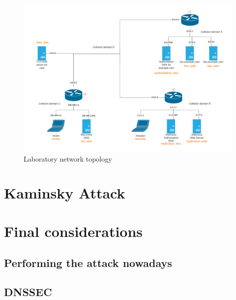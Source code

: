\documentclass[11pt,a4paper]{article}
\begin{document}
\begin{figure}[h!]
  \centering
  \includegraphics[width=16cm]{network-topology.png}
  \caption{Laboratory network topology}
\end{figure}

\newpage
\section{Kaminsky Attack}

\section{Final considerations}

\subsection{Performing the attack nowadays}

\subsection{DNSSEC}
\end{document}
